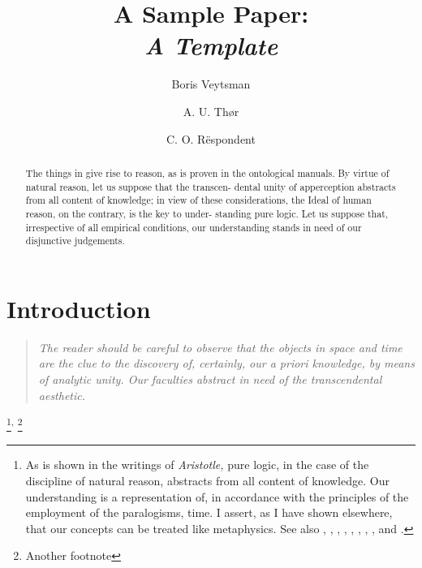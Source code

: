 \documentclass[screen]{resphilosophica}
\title[A Sample Paper: A Template]{A Sample Paper:\\ \emph{A
  Template}}
\author{Boris Veytsman}
\author{A. U. Th{\o}r}
\author{C. O. R\"espondent}
\begin{document}
%
%
%

\begin{abstract}
  The things in  give rise to reason, as is 
  proven in the ontological manuals. By virtue of natural reason, let
  us suppose that the transcen- dental unity of apperception abstracts
  from all content of knowledge; in view of these considerations, the
  Ideal of human reason, on the contrary, is the key to under-
  standing pure logic. Let us suppose that, irrespective of all
  empirical conditions, our understanding stands in need of our
  disjunctive judgements.
\end{abstract}
\maketitle

\kant[4]

\setcounter{footnote}{0}

\section{Introduction}
\label{sec:intro}

\begin{quotation}
  \em
  The reader should be careful to observe that the objects in
  space and time are the clue to the discovery of, certainly,
  our a priori knowledge, by means of analytic unity. Our
  faculties abstract  in
   need of  the transcendental aesthetic. 
  \em \citep{Gregorio:Kantlipsum}
\end{quotation}

\bigskip
\noindent %
\kant[2-4]\kant[34]

\kant*[7]\footnote{As is shown in the writings of \emph{Aristotle,} pure
  logic, in the case of the discipline of natural reason, abstracts
  from all content of knowledge. Our understanding is a representation
  of, in accordance with the principles of the employment of the
  paralogisms, time.  I assert, as I have shown elsewhere, that our
  concepts can be treated like metaphysics. See also \citep{Landau5},
  \citep{Hoff10}, \citep{Rao07:BeliefPropagation}, \citep{faga06a},
  \citep{bochnga}, \citep{aqui51a}, \citep{Mapas12}, \citep{ande97a},
  \citep{irig93a}
  and \citep{Knuth94:TheTeXbook}.}\textsuperscript{, }\footnote{Another footnote} 
\end{document}
